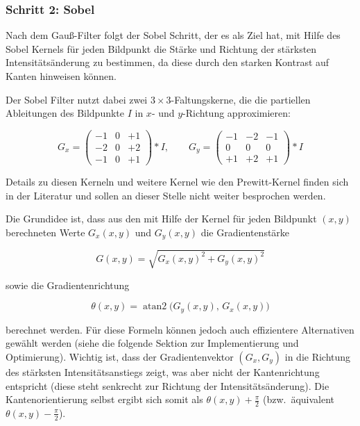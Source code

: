 \subsubsection{Schritt 2: Sobel}
Nach dem Gauß-Filter folgt der Sobel Schritt, der es als Ziel hat, mit Hilfe des Sobel Kernels \cite[S. 716ff.]{gonzalez_digital_2018} für jeden Bildpunkt die Stärke und Richtung der stärksten Intensitätsänderung zu bestimmen, da diese durch den starken Kontrast auf Kanten hinweisen können.

Der Sobel Filter nutzt dabei zwei $3 \times 3$-Faltungskerne, die die partiellen
Ableitungen des Bildpunkte $I$ in $x$- und $y$-Richtung approximieren:

\begin{equation}
    G_x =
    \begin{pmatrix}
        -1 & 0 & +1 \\
        -2 & 0 & +2 \\
        -1 & 0 & +1
    \end{pmatrix}
    * I,
    \qquad
    G_y =
    \begin{pmatrix}
        -1 & -2 & -1 \\
         0 &  0 &  0 \\
        +1 & +2 & +1
    \end{pmatrix}
    * I
\end{equation}

Details zu diesen Kerneln und weitere Kernel wie den Prewitt-Kernel finden sich in der Literatur \cite{gonzalez_digital_2018} und sollen an dieser Stelle nicht weiter besprochen werden.

Die Grundidee ist, dass aus den mit Hilfe der Kernel für jeden Bildpunkt $(x,y)$ berechneten Werte $G_x(x,y)$ und $G_y(x,y)$ die Gradientenstärke

\begin{equation}
    G(x,y) = \sqrt{G_x(x,y)^2 + G_y(x,y)^2}
\end{equation}

sowie die Gradientenrichtung

\begin{equation}
    \theta(x,y) = \operatorname{atan2}\bigl(G_y(x,y),\, G_x(x,y)\bigr)
\end{equation}

berechnet werden. Für diese Formeln können jedoch auch effizientere Alternativen gewählt werden (siehe die folgende Sektion zur Implementierung und Optimierung). Wichtig ist, dass der Gradientenvektor $(G_x, G_y)$ in die
Richtung des stärksten Intensitätsanstiegs zeigt, was aber nicht der Kantenrichtung entspricht (diese steht senkrecht zur Richtung der Intensitätsänderung). Die Kantenorientierung selbst ergibt sich somit als
$\theta(x,y) + \tfrac{\pi}{2}$ (bzw.\ äquivalent $\theta(x,y) - \tfrac{\pi}{2}$).

